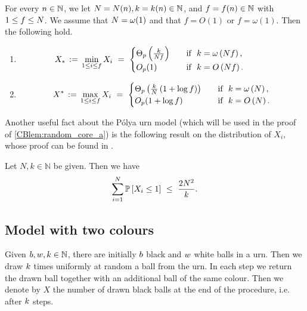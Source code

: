 \begin{thm}\label{CBmain1}
For every $n \in \mathbb{N}$, we let $N=N(n), k=k(n) \in \mathbb{N}$, and $f=f(n) \in \mathbb{N}$ with $1\leq f \leq N$. We assume that $N=\omega(1)$ and that $f=O(1)$ or $f=\omega(1)$. Then the following hold.
	\begin{enumerate}
		\item\label{CBthm:main1_1}
		\begin{equation*}
	\hspace{-7ex}	X_*\, :=\, \min_{1\leq \ind \leq f}X_\ind\ =\ 
		\begin{cases}
		\Theta_p\left(\frac{\nd}{\nc f}\right) &\quad \text{if}~~ \nd=\omega\left(\nc f\right),
		\\
		O_p(1) &\quad \text{if}~~ \nd=O\left(\nc f\right).
		\end{cases}
		\end{equation*}
		\item \label{CBthm:main1_2}
		\begin{equation*}
		X^*\, :=\, \max_{1\leq \ind \leq f}X_\ind\ =\ 
		\begin{cases}
		\Theta_p\left(\frac{\nd}{\nc}\left(1+\log f\right)\right) &\quad \text{if}~~ \nd=\omega\left(\nc\right),
		\\
		O_p(1+\log f) &\quad \text{if}~~ \nd=O\left(\nc\right).
		\end{cases}
		\end{equation*}
	\end{enumerate}
\end{thm}

Another useful fact about the P\'olya urn model (which will be used in the proof of \ref{CBlem:random_core_a}) is the following result on the distribution of $X_i$, whose proof can be found in .

\begin{prop}\label{CBprop:polya_main}
	Let $N,k\in \mathbb N$ be given. Then we have 
		\begin{align*}
		\sum_{\ind=1}^{\nc}\prob{X_\ind \leq 1}\ \leq\ \frac{2\nc^2}{\nd}.
		\end{align*}
\end{prop}

\smallskip
\subsection{Model with two colours}\label{CBsub:polya2}
Given $b, w, k \in \mathbb{N}$, there are initially $b$ black and $w$ white balls in a urn. Then we draw $k$ times uniformly at random a ball from the urn. In each step we return the drawn ball together with an additional ball of the same colour. Then we denote by $X$ the number of drawn black balls at the end of the procedure, i.e. after $k$ steps. 

